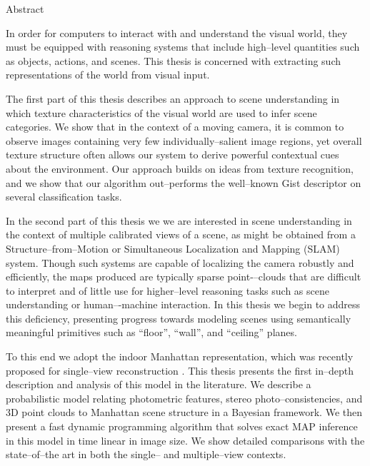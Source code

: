 {
\Large
\noindent\makebox[3in][l]{\xauthor}\hfill{} \vskip 1pt
\makebox[3in][l]{\xcollege}\hfill\makebox[3in][r]{\xterm}
}

\vskip 1cm

{
\LARGE \bf
\begin{center}
{\xtitle}
\end{center}
}

{
\large\bf
\begin{center}
Abstract
\end{center}
}

\setlength{\baselineskip}{16truept}

In order for computers to interact with and understand the visual
world, they must be equipped with reasoning systems that include
high--level quantities such as objects, actions,
and scenes. This thesis is concerned with extracting such
representations of the world from visual input.

The first part of this thesis describes an approach to scene
understanding in which texture characteristics of the visual world are
used to infer scene categories. We show that in the context of a
moving camera, it is common to observe images containing very few
individually--salient image regions, yet overall texture structure
often allows our system to derive powerful contextual cues about the
environment. Our approach builds on ideas from texture recognition,
and we show that our algorithm out--performs the well--known
Gist \cite{Torralba03} descriptor on several classification tasks.

In the second part of this thesis we we are interested in scene
understanding in the context of multiple calibrated views of a scene,
as might be obtained from a Structure--from--Motion or Simultaneous
Localization and Mapping (SLAM) system. Though such systems are
capable of localizing the camera robustly and efficiently, the maps
produced are typically sparse point-–clouds that are difficult to
interpret and of little use for higher--level reasoning tasks such as
scene understanding or human–-machine interaction. In this thesis we
begin to address this deficiency, presenting progress towards
modeling scenes using semantically meaningful primitives such as
“floor”, “wall”, and “ceiling” planes.

To this end we adopt the indoor Manhattan representation, which was
recently proposed for single--view reconstruction \cite{Lee09}. This
thesis presents the first in--depth description and analysis of
this model in the literature. We describe a probabilistic
model relating photometric features, stereo photo--consistencies, and
3D point clouds to Manhattan scene structure in a Bayesian
framework. We then present a fast dynamic programming algorithm that solves
exact MAP inference in this model in time linear in image size. We
show detailed comparisons with the state--of--the art in both the
single-- and multiple--view contexts.

